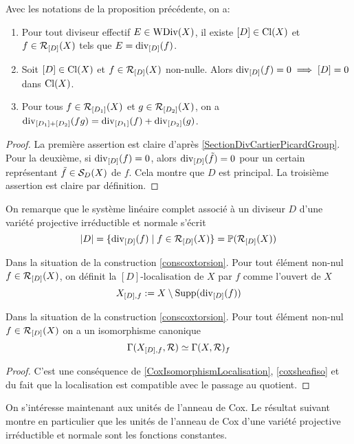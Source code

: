 \begin{prop}\label{diviCoxTorsFormulas}
Avec les notations de la proposition précédente, on a:
\begin{enumerate}
\item Pour tout diviseur effectif $E\in\operatorname{WDiv}(X)$, il existe $[D]\in\operatorname{Cl}(X)$ et $f\in\mathcal{R}_{[D]}(X)$ tels que $E=\operatorname{div}_{[D]}(f)$.
\item Soit $[D]\in\operatorname{Cl}(X)$ et $f\in\mathcal{R}_{[D]}(X)$ non-nulle. Alors $\operatorname{div}_{[D]}(f)=0\implies [D]=0$ dans $\operatorname{Cl}(X)$.
\item Pour tous $f\in\mathcal{R}_{[D_1]}(X)$ et $g\in\mathcal{R}_{[D_2]}(X)$, on a $\operatorname{div}_{[D_1]+[D_2]}(fg)=\operatorname{div}_{[D_1]}(f)+\operatorname{div}_{[D_2]}(g)$.
\end{enumerate}
\end{prop}
\begin{proof}
La première assertion est claire d'après \ref{SectionDivCartierPicardGroup}. Pour la deuxième, si $\operatorname{div}_{[D]}(f)=0$, alors $\operatorname{div}_{[D]}(\tilde{f})=0$ pour un certain représentant $\tilde{f}\in\mathcal{S}_D(X)$ de $f$. Cela montre que $D$ est principal. La troisième assertion est claire par définition.
\end{proof}

On remarque que le système linéaire complet associé à un diviseur $D$ d'une variété projective irréductible et normale s'écrit
$$|D|=\lbrace\operatorname{div}_{[D]}(f)\mid f\in \mathcal{R}_{[D]}(X)\rbrace = \mathbb{P}(\mathcal{R}_{[D]}(X))$$

\begin{defn}
Dans la situation de la construction \ref{conscoxtorsion}. Pour tout élément non-nul $f\in\mathcal{R}_{[D]}(X)$, on définit la $[D]$-localisation de $X$ par $f$ comme l'ouvert de $X$
$$X_{[D],f}:=X\setminus\operatorname{Supp}(\operatorname{div}_{[D]}(f))$$
\end{defn}

\begin{prop}
Dans la situation de la construction \ref{conscoxtorsion}. Pour tout élément non-nul $f\in\mathcal{R}_{[D]}(X)$ on a un isomorphisme canonique
$$\Gamma(X_{[D],f},\mathcal{R})\simeq \Gamma(X,\mathcal{R})_f$$
\end{prop}
\begin{proof}
C'est une conséquence de \ref{CoxIsomorphismLocalisation}, \ref{coxsheafiso} et du fait que la localisation est compatible avec le passage au quotient.
\end{proof}

On s'intéresse maintenant aux unités de l'anneau de Cox. Le résultat suivant montre en particulier que les unités de l'anneau de Cox d'une variété projective irréductible et normale sont les fonctions constantes.

